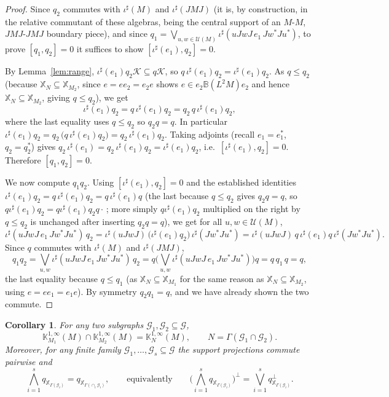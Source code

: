 \documentclass[a4paper, 11pt, reqno]{amsart}
\numberwithin{equation}{section}
\theoremstyle{plain}
\newtheorem{corollary}[thm]{Corollary}
\theoremstyle{remark}
\theoremstyle{definition}
\newcommand{\B}{\mathbb{B}}
\newcommand{\KKK}{{\mathbb K}}
\newcommand{\KK}{{\mathcal K}}
\newcommand{\XX}{{\mathbb{X}}}
\newcommand{\GG}{{\mathcal G}}
\begin{document}
\begin{proof}
Since $q_2$ commutes with $\iota^\sharp(M)$ and $\iota^\sharp(JMJ)$ (it is, by construction, in the relative commutant of these algebras, being the central support of an $M$-$M$, $JMJ$-$JMJ$ boundary piece), and since
$q_1=\bigvee_{u,w\in\mathcal U(M)}\iota^\sharp(uJwJ\,e_1\,Jw^*Ju^*)$,
to prove $[q_1,q_2]=0$ it suffices to show $[\iota^\sharp(e_1),q_2]=0$.

By Lemma~\ref{lem:range}, $\iota^\sharp(e_1)q_2\KK\subseteq q\KK$, so $q\,\iota^\sharp(e_1)q_2=\iota^\sharp(e_1)q_2$. As $q\le q_2$ (because $\XX_N\subseteq\XX_{M_2}$, since $e=e e_2=e_2 e$ shows $e\in e_2\B(L^2M)e_2$ and hence $\XX_N\subseteq\XX_{M_2}$, giving $q\le q_2$), we get
\[
\iota^\sharp(e_1)q_2=q\,\iota^\sharp(e_1)q_2=q_2\,q\,\iota^\sharp(e_1)q_2 ,
\]
where the last equality uses $q\le q_2$ so $q_2q=q$. In particular $\iota^\sharp(e_1)q_2=q_2\,\big(q\,\iota^\sharp(e_1)q_2\big)=q_2\,\iota^\sharp(e_1)q_2$. Taking adjoints (recall $e_1=e_1^*$, $q_2=q_2^*$) gives $q_2\,\iota^\sharp(e_1)=q_2\,\iota^\sharp(e_1)q_2=\iota^\sharp(e_1)q_2$, i.e.\ $[\iota^\sharp(e_1),q_2]=0$. Therefore $[q_1,q_2]=0$.

We now compute $q_1q_2$. Using $[\iota^\sharp(e_1),q_2]=0$ and the established identities $\iota^\sharp(e_1)q_2=q\,\iota^\sharp(e_1)q_2=q\,\iota^\sharp(e_1)q$ (the last because $q\le q_2$ gives $q_2q=q$, so $q\iota^\sharp(e_1)q_2=q\iota^\sharp(e_1)q_2 q\cdot$\,; more simply $q\iota^\sharp(e_1)q_2$ multiplied on the right by $q\le q_2$ is unchanged after inserting $q_2q=q$), we get for all $u,w\in\mathcal U(M)$,
\[
\iota^\sharp(uJwJ\,e_1\,Jw^*Ju^*)\,q_2
=\iota^\sharp(uJwJ)\,\big(\iota^\sharp(e_1)q_2\big)\,\iota^\sharp(Jw^*Ju^*)
=\iota^\sharp(uJwJ)\,q\,\iota^\sharp(e_1)q\,\iota^\sharp(Jw^*Ju^*).
\]
Since $q$ commutes with $\iota^\sharp(M)$ and $\iota^\sharp(JMJ)$,
\[
q_1q_2=\bigvee_{u,w}\iota^\sharp(uJwJ\,e_1\,Jw^*Ju^*)\,q_2
=q\Big(\bigvee_{u,w}\iota^\sharp(uJwJ\,e_1\,Jw^*Ju^*)\Big)q
=q\,q_1\,q=q,
\]
the last equality because $q\le q_1$ (as $\XX_N\subseteq\XX_{M_1}$ for the same reason as $\XX_N\subseteq\XX_{M_2}$, using $e=ee_1=e_1e$). By symmetry $q_2q_1=q$, and we have already shown the two commute.
\end{proof}

\begin{corollary}\label{cor:intersection}
For any two subgraphs $\GG_1,\GG_2\subseteq\GG$,
\[
\KKK^{1,\infty}_{M_1}(M)\cap\KKK^{1,\infty}_{M_2}(M)=\KKK^{1,\infty}_{N}(M),
\qquad N=\Gamma(\GG_1\cap\GG_2).
\]
Moreover, for any finite family $\GG_1,\dots,\GG_s\subseteq\GG$ the support projections commute pairwise and
\begin{equation}\label{eq:meet}
\bigwedge_{i=1}^s q_{\XX_{\Gamma(\GG_i)}}=q_{\XX_{\Gamma(\cap_i\GG_i)}},\qquad\text{equivalently}\qquad
\Big(\bigwedge_{i=1}^s q_{\XX_{\Gamma(\GG_i)}}\Big)^{\!\perp}=\bigvee_{i=1}^s q_{\XX_{\Gamma(\GG_i)}}^{\perp}.
\end{equation}
\end{corollary}
\end{document}
